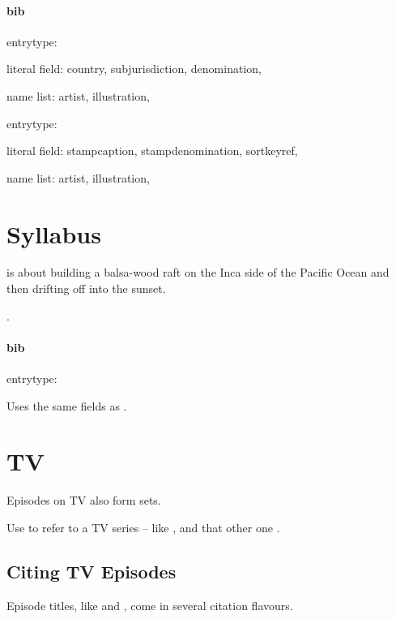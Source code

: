 \paragraph{bib}

entrytype: 

literal field: country,
  subjurisdiction,
  denomination,


name list: artist,
  illustration,
  
\medskip
entrytype: 

literal field: stampcaption,
  stampdenomination,
  sortkeyref,


name list: artist,
  illustration,
  
\ddivider





\section{Syllabus}
 is about building a balsa-wood raft on the Inca side of the Pacific Ocean and  then drifting off into the sunset.

.

\nocite{esdrama}
\nocite{esnovels}
\nocite{esnonfiction}


\paragraph{bib}

entrytype: 

Uses the same fields as .

\ddivider




\section{TV}
Episodes on TV also form sets.

Use  to refer to a TV series -- like {\color{blue}}, and that other one {\color{blue}}.

\subsection{Citing TV Episodes}
Episode titles, like {\color{blue}} and {\color{blue}}, come in several citation flavours.

